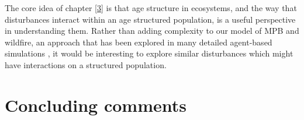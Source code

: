 The core idea of chapter \ref{3} is that age structure in ecosystems, and the way that disturbances interact within an age structured population, is a useful perspective in understanding them. Rather than adding complexity to our model of MPB and wildfire, an approach that has been explored in many detailed agent-based simulations \cite{caldwell2013simulated,perrakis2014modeling,ager2007modeling,loehman2017interactions}, it would be interesting to explore similar disturbances which might have interactions on a structured population. 
\section{Concluding comments}